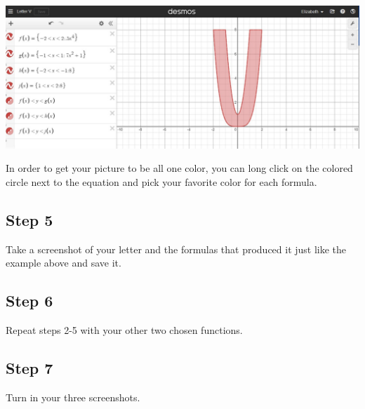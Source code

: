 \documentclass{ximera}
\begin{document}
\begin{image}
\includegraphics{LetterVExample.jpg}
\end{image}

In order to get your picture to be all one color, you can long click on the colored circle next to the equation and pick your favorite color for each formula.

\subsection{Step 5}  Take a screenshot of your letter and the formulas that produced it just like the example above and save it.

\subsection{Step 6}  Repeat steps 2-5 with your other two chosen functions.

\subsection{Step 7}  Turn in your three screenshots.
 
\end{document}
